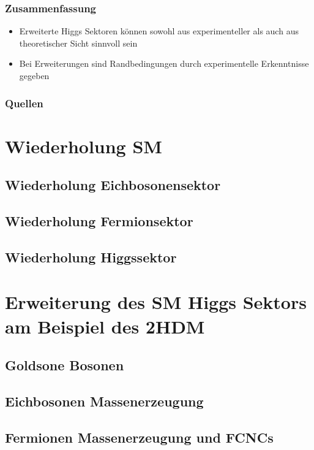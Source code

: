 \documentclass{beamer}
\begin{document}
\begin{frame}
\frametitle{Zusammenfassung}
\begin{itemize}
\item Erweiterte Higgs Sektoren können sowohl aus experimenteller als auch aus theoretischer Sicht sinnvoll sein
\item Bei Erweiterungen sind Randbedingungen durch experimentelle Erkenntnisse gegeben 
\end{itemize}
\end{frame}

\begin{frame}
\frametitle{Quellen}
\renewcommand*{\bibfont}{\tiny}


\section{Wiederholung SM}
\subsection{Wiederholung Eichbosonensektor}
\subsection{Wiederholung Fermionsektor}
\subsection{Wiederholung Higgssektor}
\section{Erweiterung des SM Higgs Sektors am Beispiel des 2HDM}
\subsection{Goldsone Bosonen}
\subsection{Eichbosonen Massenerzeugung}
\subsection{Fermionen Massenerzeugung und FCNCs}

\cite{1}\cite{2}\cite{3}\cite{4}\cite{5}\cite{6}\cite{7}
\printbibliography

\end{frame}

 
\end{document}

